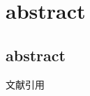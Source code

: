 \section{ abstract}
\setcounter{page}{1}%

\subsection{ abstract }

文献引用
\cite{han_materials_2021}%

